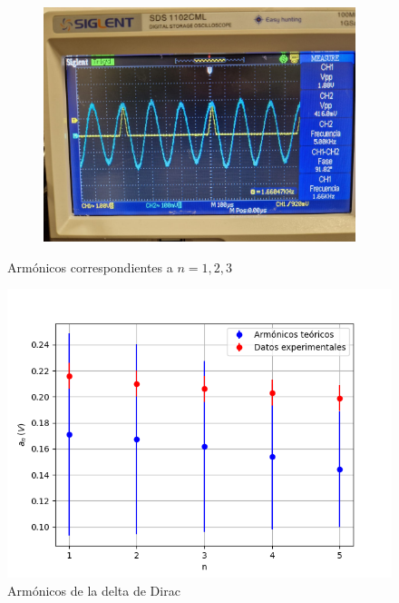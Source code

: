 \documentclass[a4paper,12pt,titlepage]{article}
\begin{document}
\begin{figure}[h!]
\begin{subfigure}{0.45\textwidth}
        \centering
        \includegraphics[width=1.05\linewidth]{fourier/delta_dirac/delta3.jpg}
        \label{fig:subfig3}
    \end{subfigure}
    \caption{Armónicos correspondientes a $n=1,2,3$}
\end{figure}


\begin{figure}[h!]
    \centering
    \includegraphics[width=0.55\linewidth]{fourier/pulso_dirac2.png}
    \caption{Armónicos de la delta de Dirac}
    \label{fig:enter-label}
\end{figure}

\newpage
\end{document}
